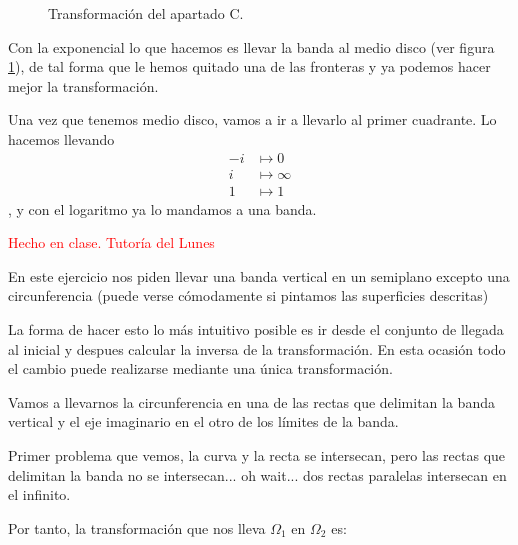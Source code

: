 \begin{problem}[10]
\begin{figure}[hbtp]
\caption{Transformación del apartado C.}
\label{figEj7C}
\end{figure}

Con la exponencial lo que hacemos es llevar la banda al medio disco (ver figura \ref{figEj7C}), de tal forma que le hemos quitado una de las fronteras y ya podemos hacer mejor la transformación.

Una vez que tenemos medio disco, vamos a ir a llevarlo al primer cuadrante. Lo hacemos llevando\begin{align*}
-i &\mapsto 0 \\
i &\mapsto ∞ \\
1 &\mapsto 1
\end{align*}, y con el logaritmo ya lo mandamos a una banda.


\spart


\textcolor{red}{Hecho en clase. Tutoría del Lunes}

En este ejercicio nos piden llevar una banda vertical en un semiplano excepto una circunferencia (puede verse cómodamente si pintamos las superficies descritas)

La forma de hacer esto lo más intuitivo posible es ir desde el conjunto de llegada al inicial y despues calcular la inversa de la transformación. En esta ocasión todo el cambio puede realizarse mediante una única transformación.

Vamos a llevarnos la circunferencia en una de las rectas que delimitan la banda vertical y el eje imaginario en el otro de los límites de la banda.

Primer problema que vemos, la curva y la recta se intersecan, pero las rectas que delimitan la banda no se intersecan... oh wait... dos rectas paralelas intersecan en el infinito.

Por tanto, la transformación que nos lleva $Ω_1$ en $Ω_2$ es:


\end{problem}
